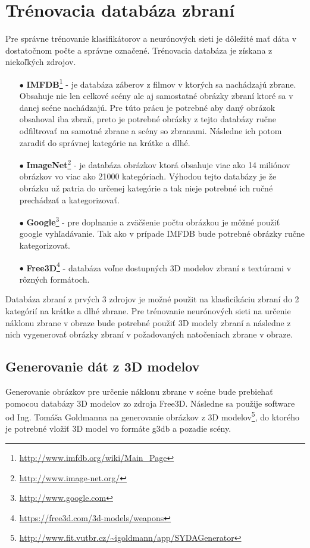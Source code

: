
\section{Trénovacia databáza zbraní}
\label{sec:databaza}
Pre správne trénovanie klasifikátorov a neurónových sieti je dôležité mať dáta v dostatočnom počte a správne označené.
Trénovacia databáza je získana z niekoľkých zdrojov.
\begin{enumerate}
    \item[$\bullet$] \textbf{IMFDB}\footnote{\url{http://www.imfdb.org/wiki/Main_Page}} - je databáza záberov z filmov v ktorých sa nachádzajú zbrane.
    Obsahuje nie len celkové scény ale aj samostatné obrázky zbraní ktoré sa v danej scéne nachádzajú.
    Pre túto prácu je potrebné aby daný obrázok obsahoval iba zbraň, preto je potrebné obrázky z tejto databázy ručne odfiltrovať na samotné zbrane a scény so zbranami.
    Následne ich potom zaradiť do správnej kategórie na krátke a dlhé.
    \item[$\bullet$] \textbf{ImageNet}\footnote{\url{http://www.image-net.org/}} - je databáza obrázkov ktorá obsahuje viac ako 14 miliónov obrázkov vo viac ako 21000 kategóriach.
    Výhodou tejto databázy je že obrázku už patria do určenej kategórie a tak nieje potrebné ich ručné prechádzať a kategorizovať.
    \item[$\bullet$] \textbf{Google}\footnote{\url{http://www.google.com}} - pre doplnanie a zväčšenie počtu obrázkou je môžné použiť google vyhľadávanie.
    Tak ako v prípade IMFDB bude potrebné obrázky ručne kategorizovať.
    \item[$\bullet$] \textbf{Free3D}\footnote{\url{https://free3d.com/3d-models/weapons}} - databáza voľne dostupných 3D modelov zbraní s textúrami v rôzných formátoch.
\end{enumerate}

Databáza zbraní z prvých 3 zdrojov je možné použit na klasficikáciu zbraní do 2 kategórií na krátke a dlhé zbrane.
Pre trénovanie neurónových sieti na určenie náklonu zbrane v obraze bude potrebné použiť 3D modely zbraní a následne z nich vygenerovať
    obrázky zbraní v požadovaných natočeniach zbrane v obraze.

\subsection{Generovanie dát z 3D modelov}
\label{subsec:generovanie3d}
Generovanie obrázkov pre určenie náklonu zbrane v scéne bude prebiehať pomocou databázy 3D modelov zo zdroja Free3D.
Následne sa použije software od Ing. Tomáša Goldmanna na generovanie obrázkov z 3D modelov\footnote{\url{http://www.fit.vutbr.cz/~igoldmann/app/SYDAGenerator}},
    do ktorého je potrebné vložiť 3D model vo formáte g3db a pozadie scény.

